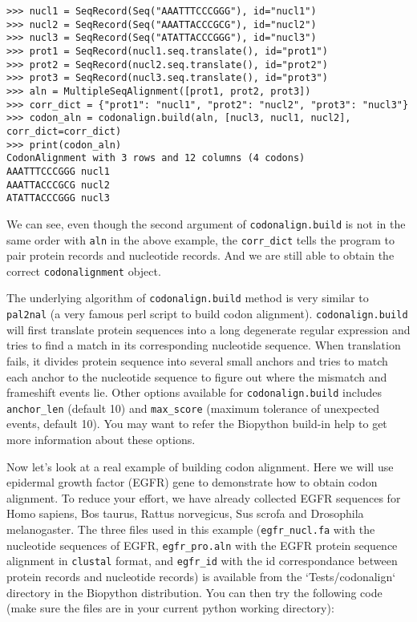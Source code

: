 \documentclass{article}
\begin{document}
\begin{verbatim}
>>> nucl1 = SeqRecord(Seq("AAATTTCCCGGG"), id="nucl1")
>>> nucl2 = SeqRecord(Seq("AAATTACCCGCG"), id="nucl2")
>>> nucl3 = SeqRecord(Seq("ATATTACCCGGG"), id="nucl3")
>>> prot1 = SeqRecord(nucl1.seq.translate(), id="prot1")
>>> prot2 = SeqRecord(nucl2.seq.translate(), id="prot2")
>>> prot3 = SeqRecord(nucl3.seq.translate(), id="prot3")
>>> aln = MultipleSeqAlignment([prot1, prot2, prot3])
>>> corr_dict = {"prot1": "nucl1", "prot2": "nucl2", "prot3": "nucl3"}
>>> codon_aln = codonalign.build(aln, [nucl3, nucl1, nucl2], corr_dict=corr_dict)
>>> print(codon_aln)
CodonAlignment with 3 rows and 12 columns (4 codons)
AAATTTCCCGGG nucl1
AAATTACCCGCG nucl2
ATATTACCCGGG nucl3
\end{verbatim}

We can see, even though the second argument of \texttt{codonalign.build}
is not in the same order with \texttt{aln} in the above example, the
\texttt{corr\_dict} tells the program to pair protein records and
nucleotide records. And we are still able to obtain the correct
\texttt{codonalignment} object.

The underlying algorithm of \texttt{codonalign.build} method is very
similar to \texttt{pal2nal} (a very famous perl script to build codon
alignment). \texttt{codonalign.build} will first translate protein
sequences into a long degenerate regular expression and tries to find a
match in its corresponding nucleotide sequence. When translation fails,
it divides protein sequence into several small anchors and tries to match
each anchor to the nucleotide sequence to figure out where the mismatch
and frameshift events lie. Other options available for
\texttt{codonalign.build} includes \texttt{anchor\_len} (default 10) and
\texttt{max\_score} (maximum tolerance of unexpected events, default
10). You may want to refer the Biopython build-in help to get more
information about these options.

Now let's look at a real example of building codon alignment. Here we
will use epidermal growth factor (EGFR) gene to demonstrate how to
obtain codon alignment. To reduce your effort, we have already collected
EGFR sequences for Homo sapiens, Bos taurus, Rattus norvegicus,
Sus scrofa and Drosophila melanogaster. The three files used in this example
(\texttt{egfr\_nucl.fa} with the nucleotide sequences of EGFR,
\texttt{egfr\_pro.aln} with the EGFR protein sequence alignment in
\texttt{clustal} format, and \texttt{egfr\_id} with the id correspondance between protein records and nucleotide records) is available from the `Tests/codonalign` directory in the Biopython distribution.
You can then try the following code (make sure the files are in
your current python working directory):
\end{document}
